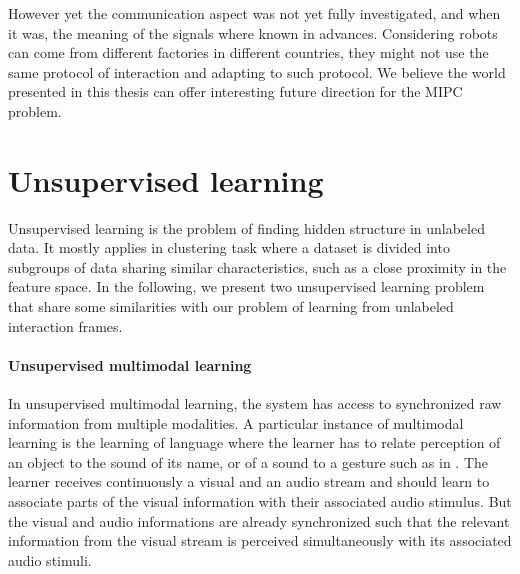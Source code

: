 However yet the communication aspect was not yet fully investigated, and when it was, the meaning of the signals where known in advances. Considering robots can come from different factories in different countries, they might not use the same protocol of interaction and adapting to such protocol. We believe the world presented in this thesis can offer interesting future direction for the MIPC problem.






\section{Unsupervised learning}

Unsupervised learning is the problem of finding hidden structure in unlabeled data. It mostly applies in clustering task where a dataset is divided into subgroups of data sharing similar characteristics, such as a close proximity in the feature space. In the following, we present two unsupervised learning problem that share some similarities with our problem of learning from unlabeled interaction frames.


\paragraph{Unsupervised multimodal learning} In unsupervised multimodal learning, the system has access to synchronized raw information from multiple modalities. A particular instance of multimodal learning is the learning of language where the learner has to relate perception of an object to the sound of its name, or of a sound to a gesture such as in \cite{mangin2013learning}. The learner receives continuously a visual and an audio stream and should learn to associate parts of the visual information with their associated audio stimulus. But the visual and audio informations are already synchronized such that the relevant information from the visual stream is perceived simultaneously with its associated audio stimuli.

